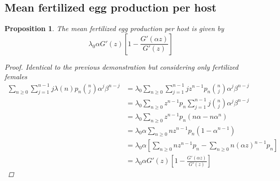 \documentclass[12pt,a4paper]{article}
\theoremstyle{plain}%
\newtheorem{prop}[thm]{Proposition}
\theoremstyle{definition}
\theoremstyle{remark}
\begin{document}
	\subsection{Mean fertilized egg production per host}
	\begin{prop}\label{prodhuevosfecun}
		The mean fertilized egg production per host is given by
		\begin{equation*}
		\lambda_0\alpha G'(z)\left[1-\frac{G'(\alpha z)}{G'(z)} \right]
		\end{equation*}
		\begin{proof}
			Identical to the previous demonstration but considering only fertilized females
			\begin{equation*}
			\begin{split}
			\sum_{n\geq 0}\sum_{j=1}^{n-1}j\lambda(n)p_n\binom{n}{j}\alpha^j\beta^{n-j}
			&=\lambda_0\sum_{n\geq 0}\sum_{j=1}^{n-1}jz^{n-1}p_n\binom{n}{j}\alpha^j\beta^{n-j}\\
			&=\lambda_0\sum_{n\geq 0}z^{n-1}p_n\sum_{j=1}^{n-1} j\binom{n}{j}\alpha^j\beta^{n-j}\\
			&=\lambda_0\sum_{n\geq 0}z^{n-1}p_n(n\alpha-n\alpha^n)\\
			&=\lambda_0\alpha\sum_{n\geq 0}nz^{n-1}p_n(1-\alpha^{n-1})\\
			&=\lambda_0\alpha \left[ \sum_{n\geq 0}nz^{n-1}p_n-\sum_{n\geq 0}n(\alpha z)^{n-1}p_n\right] \\
			&=\lambda_0\alpha G'(z)\left[1-\frac{G'(\alpha z)}{G'(z)} \right] 
			\end{split}
			\end{equation*}
		\end{proof}
	\end{prop}
\end{document}
